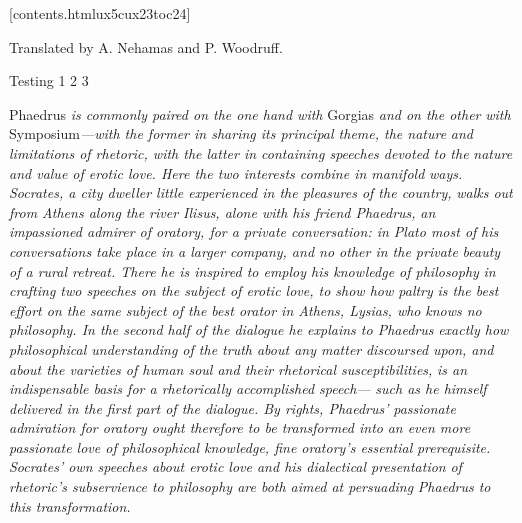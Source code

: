 [contents.htmlux5cux23toc24]

Translated by A. Nehamas and P. Woodruff.

\saysocrates Testing 1 2 3

Phaedrus {\em is commonly paired on the one hand with} Gorgias {\em and
on the other} {\em with} Symposium{\em ---with the former in sharing its
principal theme, the nature} {\em and limitations of rhetoric, with the
latter in containing speeches devoted to the} {\em nature and value of
erotic love. Here the two interests combine in manifold} {\em ways.
Socrates, a city dweller little experienced in the pleasures of the
country,} {\em walks out from Athens along the river Ilisus, alone with
his friend Phaedrus,} {\em an impassioned admirer of oratory, for a
private conversation: in Plato most of} {\em his conversations take
place in a larger company, and no other in the private} {\em beauty of a
rural retreat. There he is inspired to employ his knowledge of
philosophy} {\em in crafting two speeches on the subject of erotic love,
to show how paltry} {\em is the best effort on the same subject of the
best orator in Athens, Lysias, who} {\em knows no philosophy. In the
second half of the dialogue he explains to Phaedrus} {\em exactly how
philosophical understanding of the truth about any matter}
{\em discoursed upon, and about the varieties of human soul and their
rhetorical susceptibilities,} {\em is an indispensable basis for a
rhetorically accomplished speech---} {\em such as he himself delivered
in the first part of the dialogue. By rights, Phaedrus'} {\em passionate
admiration for oratory ought therefore to be transformed into} {\em an
even more passionate love of philosophical knowledge, fine oratory's
essential} {\em prerequisite. Socrates' own speeches about erotic love
and his dialectical presentation} {\em of rhetoric's subservience to
philosophy are both aimed at persuading} {\em Phaedrus to this
transformation.}

